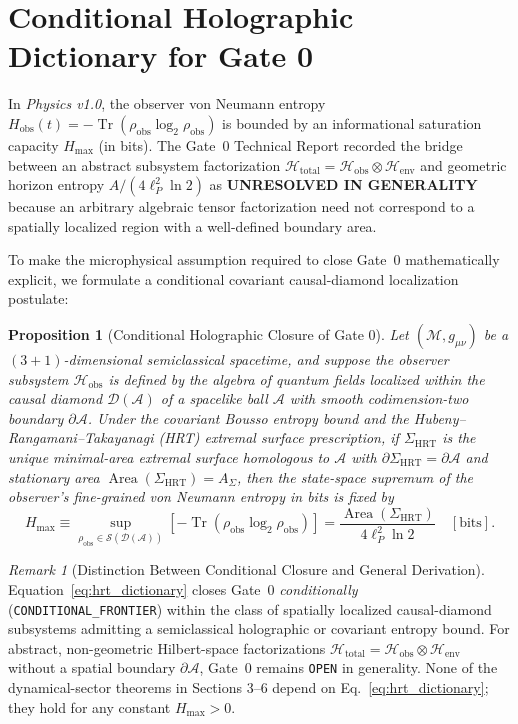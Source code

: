 \documentclass[11pt,a4paper]{article}
\newtheorem{proposition}[theorem]{Proposition}
\theoremstyle{remark}
\newtheorem{remark}[theorem]{Remark}
\begin{document}
\section{Conditional Holographic Dictionary for Gate 0}

In \textit{Physics v1.0}, the observer von Neumann entropy $H_{\text{obs}}(t) = -\operatorname{Tr}(\rho_{\text{obs}}\log_2 \rho_{\text{obs}})$ is bounded by an informational saturation capacity $H_{\max}$ (in bits). The Gate~0 Technical Report recorded the bridge between an abstract subsystem factorization $\mathcal{H}_{\text{total}} = \mathcal{H}_{\text{obs}} \otimes \mathcal{H}_{\text{env}}$ and geometric horizon entropy $A/(4\ell_P^2\ln 2)$ as \textbf{UNRESOLVED IN GENERALITY} because an arbitrary algebraic tensor factorization need not correspond to a spatially localized region with a well-defined boundary area.

To make the microphysical assumption required to close Gate~0 mathematically explicit, we formulate a conditional covariant causal-diamond localization postulate:

\begin{proposition}[Conditional Holographic Closure of Gate 0]
Let $(\mathcal{M}, g_{\mu\nu})$ be a $(3+1)$-dimensional semiclassical spacetime, and suppose the observer subsystem $\mathcal{H}_{\text{obs}}$ is defined by the algebra of quantum fields localized within the causal diamond $\mathcal{D}(\mathcal{A})$ of a spacelike ball $\mathcal{A}$ with smooth codimension-two boundary $\partial\mathcal{A}$. Under the covariant Bousso entropy bound and the Hubeny--Rangamani--Takayanagi (HRT) extremal surface prescription, if $\Sigma_{\text{HRT}}$ is the unique minimal-area extremal surface homologous to $\mathcal{A}$ with $\partial\Sigma_{\text{HRT}} = \partial\mathcal{A}$ and stationary area $\operatorname{Area}(\Sigma_{\text{HRT}}) = A_{\Sigma}$, then the state-space supremum of the observer's fine-grained von Neumann entropy in bits is fixed by
\begin{equation}
\label{eq:hrt_dictionary}
H_{\max} \equiv \sup_{\rho_{\text{obs}} \in \mathcal{S}(\mathcal{D}(\mathcal{A}))} \left[-\operatorname{Tr}\!\left(\rho_{\text{obs}}\log_2 \rho_{\text{obs}}\right)\right] = \frac{\operatorname{Area}(\Sigma_{\text{HRT}})}{4\ell_P^2 \ln 2} \quad [\text{bits}].
\end{equation}
\end{proposition}

\begin{remark}[Distinction Between Conditional Closure and General Derivation]
Equation~\eqref{eq:hrt_dictionary} closes Gate~0 \emph{conditionally} (\texttt{CONDITIONAL\_FRONTIER}) within the class of spatially localized causal-diamond subsystems admitting a semiclassical holographic or covariant entropy bound. For abstract, non-geometric Hilbert-space factorizations $\mathcal{H}_{\text{total}} = \mathcal{H}_{\text{obs}} \otimes \mathcal{H}_{\text{env}}$ without a spatial boundary $\partial\mathcal{A}$, Gate~0 remains \texttt{OPEN} in generality. None of the dynamical-sector theorems in Sections 3--6 depend on Eq.~\eqref{eq:hrt_dictionary}; they hold for any constant $H_{\max} > 0$.
\end{remark}
\end{document}
